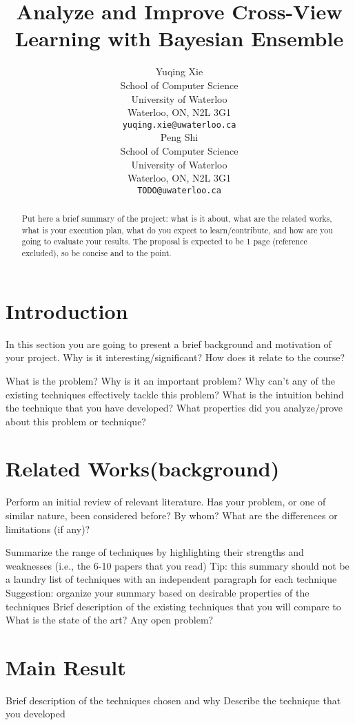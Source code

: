 \documentclass{article}
\title{Analyze and Improve Cross-View Learning with Bayesian Ensemble}
\author{
	Yuqing Xie \\
	School of Computer Science\\
	University of Waterloo\\
	Waterloo, ON, N2L 3G1 \\
	\texttt{yuqing.xie@uwaterloo.ca} \\
	\And
	Peng Shi\\
	School of Computer Science\\
	University of Waterloo\\
	Waterloo, ON, N2L 3G1 \\
	\texttt{TODO@uwaterloo.ca} \\
}
\begin{document}
\maketitle

\begin{abstract} 
Put here a brief summary of the project: what is it about, what are the related works, what is your execution plan, what do you expect to learn/contribute, and how are you going to evaluate your results. The proposal is expected to be 1 page (reference excluded), so be concise and to the point.
\end{abstract} 

\section{Introduction}
In this section you are going to present a brief background and motivation of your project. Why is it interesting/significant? How does it relate to the course?

What is the problem?
Why is it an important problem?
Why can't any of the existing techniques effectively tackle this problem?
What is the intuition behind the technique that you have developed?
What properties did you analyze/prove about this problem or technique?

\section{Related Works(background)}
Perform an initial review of relevant literature. Has your problem, or one of similar nature, been considered before? By whom? What are the differences or limitations (if any)? 

Summarize the range of techniques by highlighting their strengths and weaknesses (i.e., the 6-10 papers that you read)
Tip: this summary should not be a laundry list of techniques with an independent paragraph for each technique
Suggestion: organize your summary based on desirable properties of the techniques
Brief description of the existing techniques that you will compare to
What is the state of the art?
Any open problem?

\section{Main Result}
Brief description of the techniques chosen and why
Describe the technique that you developed
\end{document}
